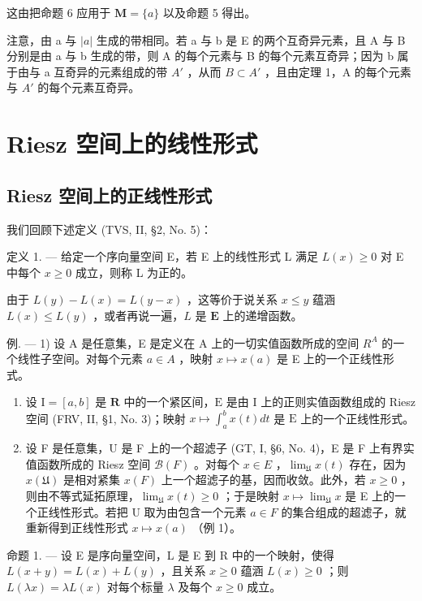 这由把命题 6 应用于 \(\mathbf{M} = \{a\}\) 以及命题 5 得出。

注意，由 a 与 \(|a|\) 生成的带相同。若 a 与 b 是 E 的两个互奇异元素，且 A 与 B 分别是由 a 与 b 生成的带，则 A 的每个元素与 B 的每个元素互奇异；因为 b 属于由与 a 互奇异的元素组成的带 \(A'\) ，从而 \(B \subset A'\) ，且由定理 1，A 的每个元素与 \(A'\) 的每个元素互奇异。

\section{Riesz 空间上的线性形式}

\subsection{Riesz 空间上的正线性形式}

我们回顾下述定义 (TVS, II, §2, No. 5)：

定义 1. --- 给定一个序向量空间 E，若 E 上的线性形式 L 满足 \(L(x) \geqslant 0\) 对 E 中每个 \(x \geqslant 0\) 成立，则称 L 为正的。

由于 \(L(y) - L(x) = L(y - x)\) ，这等价于说关系 \(x \leqslant y\) 蕴涵 \(L(x) \leqslant L(y)\) ，或者再说一遍，\(L\) 是 \(\mathbf{E}\) 上的递增函数。

例. --- 1) 设 A 是任意集，E 是定义在 A 上的一切实值函数所成的空间 \(R^{A}\) 的一个线性子空间。对每个元素 \(a \in A\) ，映射 \(x \mapsto x(a)\) 是 E 上的一个正线性形式。

\begin{enumerate}
\def\labelenumi{\arabic{enumi})}
\setcounter{enumi}{1}
\item
  设 \(\mathrm{I} = [a, b]\) 是 \(\mathbf{R}\) 中的一个紧区间，\(\mathrm{E}\) 是由 \(\mathrm{I}\) 上的正则实值函数组成的 Riesz 空间 (FRV, II, §1, No. 3)；映射 \(x \mapsto \int_{a}^{b} x(t) dt\) 是 \(\mathrm{E}\) 上的一个正线性形式。
\item
  设 F 是任意集，U 是 F 上的一个超滤子 (GT, I, §6, No. 4)，E 是 F 上有界实值函数所成的 Riesz 空间 \(\mathcal{B}(F)\) 。对每个 \(x \in E\) ，\(\lim_{\mathfrak{U}} x(t)\) 存在，因为 \(x(\mathfrak{U})\) 是相对紧集 \(x(F)\) 上一个超滤子的基，因而收敛。此外，若 \(x \geqslant 0\) ，则由不等式延拓原理，\(\lim_{\mathfrak{U}} x(t) \geqslant 0\) ；于是映射 \(x \mapsto \lim_{\mathfrak{U}} x\) 是 E 上的一个正线性形式。若把 U 取为由包含一个元素 \(a \in F\) 的集合组成的超滤子，就重新得到正线性形式 \(x \mapsto x(a)\) （例 1）。
\end{enumerate}

命题 1. --- 设 E 是序向量空间，L 是 E 到 R 中的一个映射，使得 \(L(x+y)=L(x)+L(y)\) ，且关系 \(x\geqslant0\) 蕴涵 \(L(x)\geqslant0\) ；则 \(L(\lambda x)=\lambda L(x)\) 对每个标量 \(\lambda\) 及每个 \(x\geqslant0\) 成立。

